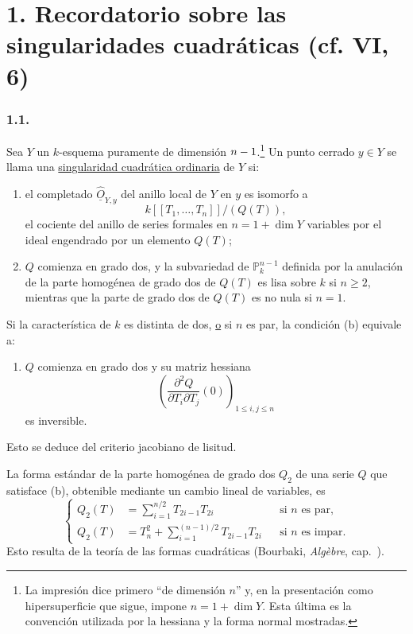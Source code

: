 \section*{1. Recordatorio sobre las singularidades cuadráticas
(cf. VI, 6)}

\subsubsection*{1.1.}
Sea $Y$ un $k$-esquema puramente de dimensión
$\sisi{n}{n-1}$.\footnote{La impresión dice primero ``de dimensión
$n$'' y, en la presentación como hipersuperficie que sigue, impone
$n=1+\dim Y$. Esta última es la convención utilizada por la hessiana
y la forma normal mostradas.}
Un punto cerrado $y\in Y$ se llama una
\underline{singularidad cuadrática ordinaria} de $Y$ si:
\begin{enumerate}
\item[(a)] el completado $\widehat{\underline O}_{Y,y}$ del anillo local
de $Y$ en $y$ es isomorfo a
\[
k[[T_1,\ldots,T_n]]/(Q(T)),
\]
el cociente del anillo de series formales en
$n=1+\dim Y$ variables por el ideal engendrado por un elemento
$Q(T)$;
\item[(b)] $Q$ comienza en grado dos, y la subvariedad de
$\mathbb P^{n-1}_k$ definida por la anulación de la parte homogénea de
grado dos de $Q(T)$ es lisa sobre $k$ si $n\geq2$, mientras que la
parte de grado dos de $Q(T)$ es no nula si $n=1$.
\end{enumerate}

Si la característica de $k$ es distinta de dos, \underline{o} si $n$
es par, la condición (b) equivale a:

\pageoriginale

\begin{enumerate}
\item[(b$'$)] $Q$ comienza en grado dos y su matriz hessiana
\[
\left(
\frac{\partial^2Q}{\partial T_i\partial T_j}(0)
\right)_{1\leq i,j\leq n}
\]
es inversible.
\end{enumerate}
Esto se deduce del criterio jacobiano de lisitud.

La forma estándar de la parte homogénea de grado dos $Q_2$ de una
serie $Q$ que satisface (b), obtenible mediante un cambio lineal de
variables, es
\begin{equation}\tag{1.1.1}
\left\{
\begin{aligned}
Q_2(T)&=\sum_{i=1}^{n/2}T_{2i-1}T_{2i}
&&\text{si $n$ es par},\\[1ex]
Q_2(T)&=T_n^2+\sum_{i=1}^{(n-1)/2}T_{2i-1}T_{2i}
&&\text{si $n$ es impar}.
\end{aligned}
\right.
\end{equation}
Esto resulta de la teoría de las formas cuadráticas (Bourbaki,
\emph{Algèbre}, cap.~).

